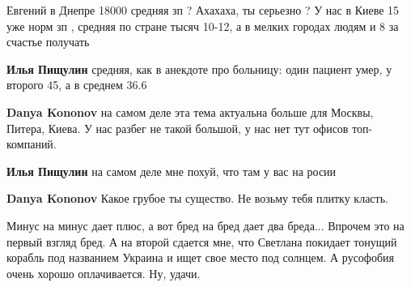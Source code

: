 \begin{itemize}
\begin{itemize}
 
Евгений в Днепре 18000 средняя зп ? Ахахаха, ты серьезно ? У нас в Киеве 15 уже норм зп , средняя по стране тысяч 10-12, а в мелких городах людям и 8 за счастье получать

 
\textbf{Илья Пищулин} средняя, как в анекдоте про больницу: один пациент умер, у второго 45, а в среднем 36.6

 
\textbf{Danya Kononov} на самом деле эта тема актуальна больше для Москвы, Питера, Киева. У нас разбег не такой большой, у нас нет тут офисов топ-компаний.

 
\textbf{Илья Пищулин} на самом деле мне похуй, что там у вас на росии

 
\textbf{Danya Kononov} Какое грубое ты существо. Не возьму тебя плитку класть.
\end{itemize}

 

Минус на минус дает плюс, а вот бред на бред дает два бреда... Впрочем это на
первый взгляд бред. А на второй сдается мне, что Светлана покидает тонущий
корабль под названием Украина и ищет свое место под солнцем. А русофобия очень
хорошо оплачивается. Ну, удачи.



\end{itemize}
